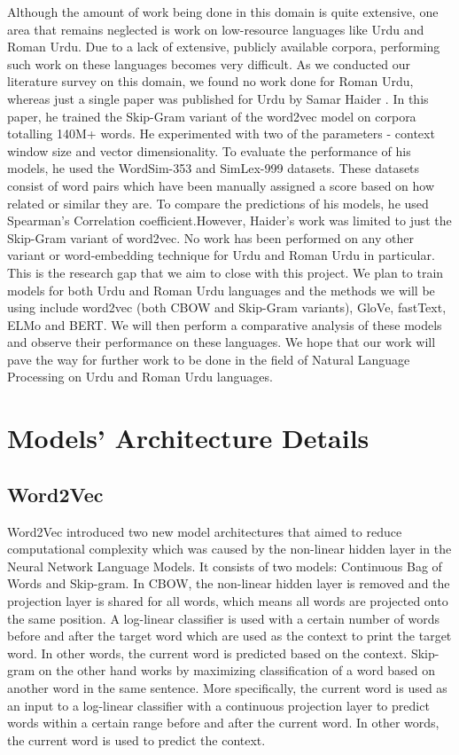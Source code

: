 \documentclass[format=acmsmall,review=true,screen=true]{acmart}
\begin{document}
Although the amount of work being done in this domain is quite extensive, one area that remains neglected is work on low-resource languages like Urdu and Roman Urdu. Due to a lack of extensive, publicly available corpora, performing such work on these languages becomes very difficult. As we conducted our literature survey on this domain, we found no work done for Roman Urdu, whereas just a single paper was published for Urdu by Samar Haider \cite{haider2018urdu}. In this paper, he trained the Skip-Gram variant of the word2vec model on corpora totalling 140M+ words. He experimented with two of the parameters - context window size and vector dimensionality. To evaluate the performance of his models, he used the WordSim-353 \cite{} and SimLex-999 \cite{hill2014simlex999} datasets. These datasets consist of word pairs which have been manually assigned a score based on how related or similar they are. To compare the predictions of his models, he used Spearman’s Correlation coefficient.However, Haider’s work was limited to just the Skip-Gram variant of word2vec. No work has been performed on any other variant or word-embedding technique for Urdu and Roman Urdu in particular. This is the research gap that we aim to close with this project. We plan to train models for both Urdu and Roman Urdu languages and the methods we will be using include word2vec (both CBOW and Skip-Gram variants), GloVe, fastText, ELMo and BERT. We will then perform a comparative analysis of these models and observe their performance on these languages. We hope that our work will pave the way for further work to be done in the field of Natural Language Processing on Urdu and Roman Urdu languages.

    \section{Models' Architecture Details}
    \subsection{Word2Vec}
    Word2Vec \cite{mikolov2013distributed} introduced two new model architectures that aimed to reduce computational complexity which was caused by the non-linear hidden layer in the Neural Network Language Models. It consists of two models: Continuous Bag of Words and Skip-gram. In CBOW, the non-linear hidden layer is removed and the projection layer is shared for all words, which means all words are projected onto the same position. A log-linear classifier is used with a certain number of words before and after the target word which are used as the context to print the target word. In other words, the current word is predicted based on the context. Skip-gram on the other hand works by maximizing classification of a word based on another word in the same sentence. More specifically, the current word is used as an input to a log-linear classifier with a continuous projection layer to predict words within a certain range before and after the current word. In other words, the current word is used to predict the context.
\end{document}
